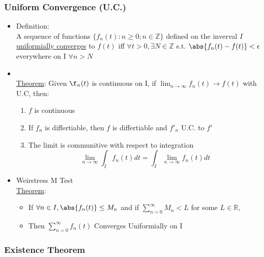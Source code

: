 \documentclass[11pt]{article}
\begin{document}
\subsubsection{Uniform Convergence (U.C.)}
\label{sec-9-1-6}
\begin{itemize}

\item Definition:\\
\label{sec-9-1-6-1}%
A sequence of functions $\{f_n(t) : n\geq 0 ; n\in\mathbb{Z}\}$
     defined on the inverval $I$ \underline{uniformially converges} to $f(t)$ iff
     $\forall t > 0, \exists N\in \mathbb{Z}$ s.t. $\abs{f_n(t)-f(t)}
     < \epsilon$ everywhere on I $\forall n > N$

\item \\
%
     \underline{Theorem}: Given $\f_n(t)$ is continuous on I, if
     $\lim_{n\rightarrow \infty}{f_n(t)} \rightarrow f(t)$ with U.C, then:
\begin{enumerate}
\item $f$ is continuous
\item If $f_n$ is differtiable, then $f$ is differtiable and $f'_n$
           U.C. to $f'$
\item The limit is communitive with respect to integration
          \begin{equation}
          \lim_{n\rightarrow \infty}\int_I f_n(t)dt = \int_I \lim_{n\rightarrow \infty} f_n(t) dt
          \end{equation}
\end{enumerate}

\item Weirstress M Test\\
\label{sec-9-1-6-3}%
\underline{Theorem}:
\begin{itemize}
\item If $\forall n \in I, \abs{f_n(t)} \leq M_n$ and if $\sum_{n=0}^\infty M_n< L$ for some $L\in \mathbb{R}$,
\item Then $\sum_{n=0}^\infty f_n(t)$ Converges Uniformially on I
\end{itemize}
\end{itemize} %
\subsubsection{Existence Theorem}
\label{sec-9-1-7}
\end{document}
